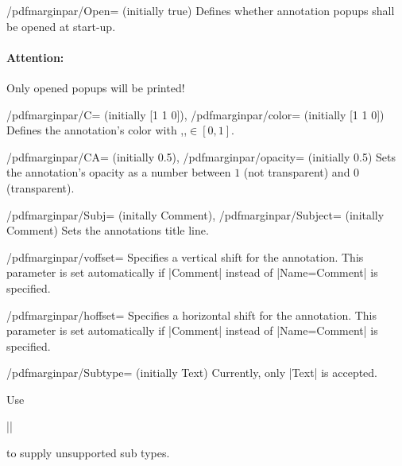 \documentclass[a4paper]{ltxdoc}
\begin{document}
\begin{key}{/pdfmarginpar/Open= (initially true)}
	Defines whether annotation popups shall be opened at start-up.

	\paragraph{Attention:} Only opened popups will be printed!
\end{key}

\begin{keylist}{
	/pdfmarginpar/C= (initially [1 1 0]),
	/pdfmarginpar/color= (initially [1 1 0])}
	Defines the annotation's color with ,,$ \in [0,1]$.
\end{keylist}

\begin{keylist}{
	/pdfmarginpar/CA= (initially 0.5),
	/pdfmarginpar/opacity= (initially 0.5)}
	Sets the annotation's opacity as a number between $1$ (not transparent) and $0$ (transparent).
\end{keylist}

\begin{keylist}{
	/pdfmarginpar/Subj= (initally Comment),
	/pdfmarginpar/Subject= (initally Comment)}
	Sets the annotations title line.
\end{keylist}

\begin{key}{/pdfmarginpar/voffset=}
	Specifies a vertical shift for the annotation. This parameter is set automatically if |Comment| instead of |Name=Comment| is specified.
\end{key}
\begin{key}{/pdfmarginpar/hoffset=}
	Specifies a horizontal shift for the annotation. This parameter is set automatically if |Comment| instead of |Name=Comment| is specified.
\end{key}

\begin{key}{/pdfmarginpar/Subtype= (initially Text)}
	Currently, only |Text| is accepted.

	Use	
	
	|\pdfmarginpar[Subtype/Other=|\meta{pdf name}|]|\marg{$\dotsc$}

	to supply unsupported sub types.
\end{key}
\end{document}
